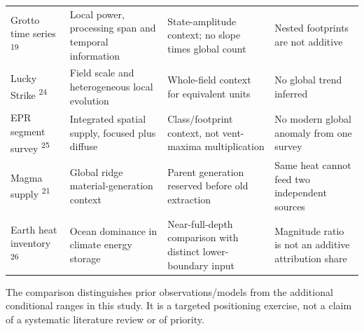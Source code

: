 \documentclass[11pt,a4paper]{article}
\begin{document}
{\begin{longtable}{>{\raggedright\arraybackslash}p{29.076mm}>{\raggedright\arraybackslash}p{40.383mm}>{\raggedright\arraybackslash}p{51.691mm}>{\raggedright\arraybackslash}p{40.383mm}}
Grotto time series \textsuperscript{19} & Local power, processing span and temporal information & State-amplitude context; no slope times global count & Nested footprints are not additive\\
Lucky Strike \textsuperscript{24} & Field scale and heterogeneous local evolution & Whole-field context for equivalent units & No global trend inferred\\
EPR segment survey \textsuperscript{25} & Integrated spatial supply, focused plus diffuse & Class/\allowbreak{}footprint context, not vent-maxima multiplication & No modern global anomaly from one survey\\
Magma supply \textsuperscript{21} & Global ridge material-generation context & Parent generation reserved before old extraction & Same heat cannot feed two independent sources\\
Earth heat inventory \textsuperscript{26} & Ocean dominance in climate energy storage & Near-full-depth comparison with distinct lower-boundary input & Magnitude ratio is not an additive attribution share\\
\end{longtable}}
The comparison distinguishes prior observations/\allowbreak{}models from the additional conditional ranges in this study. It is a targeted positioning exercise, not a claim of a systematic literature review or of priority.\par
\clearpage
\end{document}
